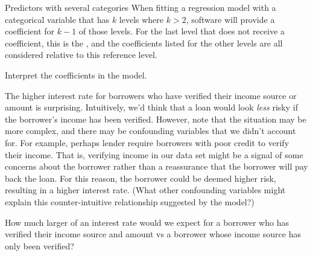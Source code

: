 \begin{onebox}{Predictors with several categories}
When fitting a regression model with a categorical variable
that has $k$ levels where $k > 2$, software will provide
a coefficient for $k - 1$ of those levels.
For the last level that does not receive a coefficient,
this is the , and the coefficients
listed for the other levels are all considered relative
to this reference level.
\end{onebox}

\D{\newpage}

\begin{exercisewrap}
\begin{nexercise}
Interpret the coefficients in the 
model.\footnotemark
\end{nexercise}
\end{exercisewrap}

The higher interest rate for borrowers who have verified
their income source or amount is surprising.
Intuitively, we'd think that a loan would look \emph{less}
risky if the borrower's income has been verified.
However, note that the situation may be more complex,
and there may be confounding variables
that we didn't account for.
For example, perhaps lender require borrowers with
poor credit to verify their income.
That is, verifying income in our data set might be
a signal of some concerns about the borrower
rather than a reassurance that the borrower will pay
back the loan.
For this reason, the borrower could be deemed higher
risk, resulting in a higher interest rate.
(What other confounding variables might explain this
counter-intuitive relationship suggested by the model?)

\begin{exercisewrap}
\begin{nexercise}
How much larger of an interest rate would we expect for
a borrower who has verified their income source and amount
vs a borrower whose income source has only been
verified?\footnotemark
\end{nexercise}
\end{exercisewrap}


